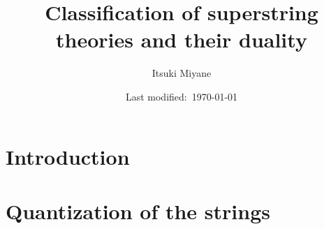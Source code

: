 \documentclass[a4paper,pdftex,10pt]{article}
\begin{document}
\title{
  Classification of superstring theories and their duality
}
\author{
  Itsuki Miyane
}
\date{Last modified:\ \today}

\maketitle

\tableofcontents

\clearpage
\section{Introduction}




















\clearpage
\section{Quantization of the strings}





















\clearpage



\nocite{Polchinski:1998rq}
\nocite{Polchinski:1998rr}

\end{document}
